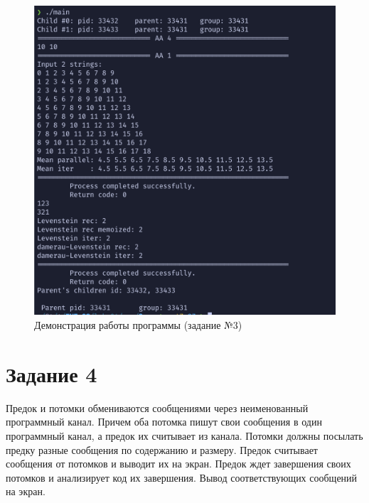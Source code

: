 \documentclass[a4paper,14pt]{article}
\begin{document}
\begin{figure}[ht]
	\centering
	\includegraphics[scale=0.8]{3.png}
	\caption{Демонстрация работы программы (задание №3)}
	\label{fig:3}
\end{figure}

\clearpage
\section*{Задание 4}

Предок и потомки обмениваются сообщениями через неименованный программный канал. Причем оба потомка пишут свои сообщения в один программный канал, а предок их считывает из канала. Потомки должны посылать предку разные сообщения по содержанию и размеру. Предок считывает сообщения от потомков и выводит их на экран. Предок ждет завершения своих потомков и анализирует код их завершения. Вывод соответствующих сообщений на экран.
\end{document}
